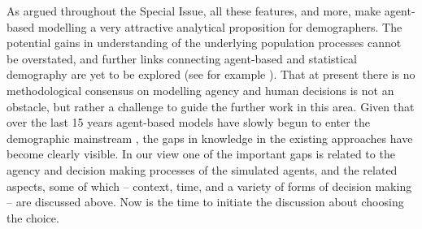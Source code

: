 \documentclass{article}
\begin{document}
As argued throughout the Special Issue, all these features, and more, make agent-based modelling a very attractive analytical proposition for demographers. The potential gains in understanding of the underlying population processes cannot be overstated, and further links connecting agent-based and statistical demography are yet to be explored (see for example \citet{Bijak2016}). That at present there is no methodological consensus on modelling agency and human decisions is not an obstacle, but rather a challenge to guide the further work in this area. Given that over the last 15 years agent-based models have slowly begun to enter the demographic mainstream \citep{Billari2003,VanBavel2016}, the gaps in knowledge in the existing approaches have become clearly visible. In our view one of the important gaps is related to the agency and decision making processes of the simulated agents, and the related aspects, some of which – context, time, and a variety of forms of decision making – are discussed above. Now is the time to initiate the discussion about choosing the choice. 



\end{document}
